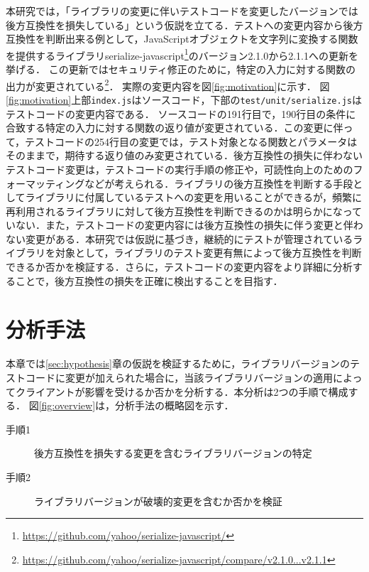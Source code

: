 \documentclass[submit]{ipsj}
\begin{document}
本研究では，「ライブラリの変更に伴いテストコードを変更したバージョンでは後方互換性を損失している」という仮説を立てる．テストへの変更内容から後方互換性を判断出来る例として，JavaScriptオブジェクトを文字列に変換する関数を提供するライブラリserialize-javascript\footnote{\url{https://github.com/yahoo/serialize-javascript/}}のバージョン2.1.0から2.1.1への更新を挙げる．
この更新ではセキュリティ修正のために，特定の入力に対する関数の出力が変更されている\footnote{\url{https://github.com/yahoo/serialize-javascript/compare/v2.1.0...v2.1.1}}．
実際の変更内容を図\ref{fig:motivation}に示す．
図\ref{fig:motivation}上部{\verb|index.js|}はソースコード，下部の{\verb|test/unit/serialize.js|}はテストコードの変更内容である．
ソースコードの191行目で，190行目の条件に合致する特定の入力に対する関数の返り値が変更されている．この変更に伴って，テストコードの254行目の変更では，テスト対象となる関数とパラメータはそのままで，期待する返り値のみ変更されている．後方互換性の損失に伴わないテストコード変更は，テストコードの実行手順の修正や，可読性向上のためのフォーマッティングなどが考えられる．ライブラリの後方互換性を判断する手段としてライブラリに付属しているテストへの変更を用いることができるが，頻繁に再利用されるライブラリに対して後方互換性を判断できるのかは明らかになっていない．また，テストコードの変更内容には後方互換性の損失に伴う変更と伴わない変更がある．本研究では仮説に基づき，継続的にテストが管理されているライブラリを対象として，ライブラリのテスト変更有無によって後方互換性を判断できるか否かを検証する．さらに，テストコードの変更内容をより詳細に分析することで，後方互換性の損失を正確に検出することを目指す．


\section{分析手法}
\label{sec:analyticalMethod}

本章では\ref{sec:hypothesis}章の仮説を検証するために，ライブラリバージョンのテストコードに変更が加えられた場合に，当該ライブラリバージョンの適用によってクライアントが影響を受けるか否かを分析する．本分析は2つの手順で構成する．
図\ref{fig:overview}は，分析手法の概略図を示す．

\begin{description}
\item[手順1] 後方互換性を損失する変更を含むライブラリバージョンの特定
\item[手順2] ライブラリバージョンが破壊的変更を含むか否かを検証
\end{description}
\end{document}
